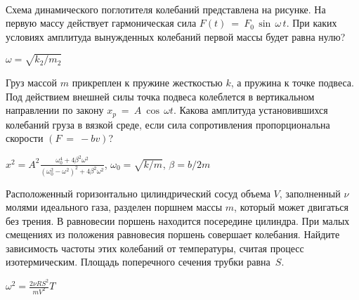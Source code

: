 \begin{ex}
\hspace{0pt} \\
\begin{minipage}{.65\textwidth}
Схема динамического поглотителя колебаний представлена на рисунке. На первую массу действует гармоническая сила $F(t)~=~F_0\,\sin\,\omega\,t$. 
При каких условиях амплитуда вынужденных колебаний первой массы будет равна нулю?
\end{minipage}
\begin{minipage}{.35\textwidth}
\centering

\end{minipage}
\begin{ans}
$\omega = \sqrt{k_2/m_2}$
\end{ans}
\end{ex}

\begin{ex}
Груз массой $m$ прикреплен к пружине жесткостью $k$, а пружина к точке подвеса. 
Под действием внешней силы точка подвеса колеблется в вертикальном направлении по закону $x_p~=~A~\cos\,\omega t$. 
Какова амплитуда установившихся колебаний груза в вязкой среде, если сила сопротивления пропорциональна скорости $(F~=~-bv)$?
\begin{ans}
$x^2 = A^2\frac{\omega_0^4+4\beta^2\omega^2}{(\omega_0^2-\omega^2)^2+4\beta^2\omega^2}$, $\omega_0 = \sqrt{k/m}$, $\beta = b/2m$
\end{ans}
\end{ex}

\begin{ex} Расположенный горизонтально цилиндрический сосуд объема $V$, заполненный $\nu$ молями идеального газа, 
разделен поршнем массы $m$, который может двигаться без трения. В равновесии поршень находится посередине цилиндра. 
При малых смещениях из положения равновесия поршень совершает колебания. Найдите зависимость частоты этих колебаний от температуры, 
считая процесс изотермическим. Площадь поперечного сечения трубки равна~$S$.
\begin{ans}
$\omega^2=\frac{2\nu R S^2}{mV^2}T$
\end{ans}
\end{ex}

